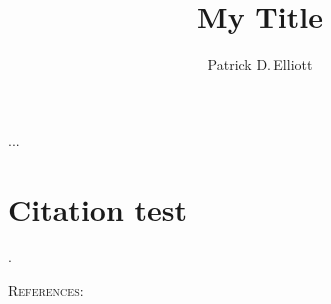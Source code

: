 \documentclass{ling-abstract}
\title{My Title}
\author{Patrick D.\,Elliott}
\begin{document}





\ex
...
\xe

\section{Citation test}

\citet{heimThesis,heim1994,heim1997,heim_presupposition_1992}.

\noindent \textsc{References:}\printbibliography[heading=none]
\end{document}
